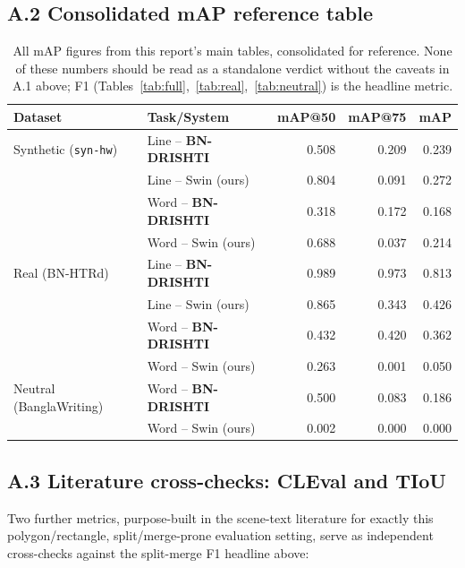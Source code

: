 \documentclass[11pt]{article}
\newcommand{\bnd}{\textbf{BN-DRISHTI}}
\begin{document}
\subsection*{A.2 Consolidated mAP reference table}

\begin{table}[H]
\centering
\caption{All mAP figures from this report's main tables, consolidated for reference.
None of these numbers should be read as a standalone verdict without the caveats in
A.1 above; F1 (Tables~\ref{tab:full},~\ref{tab:real},~\ref{tab:neutral}) is the
headline metric.}
\label{tab:appendix_map}
\footnotesize
\begin{tabular}{@{}llrrr@{}}
\toprule
Dataset & Task/System & mAP@50 & mAP@75 & mAP \\
\midrule
Synthetic (\texttt{syn-hw}) & Line -- \bnd{}   & 0.508 & 0.209 & 0.239 \\
 & Line -- Swin (ours)  & 0.804 & 0.091 & 0.272 \\
 & Word -- \bnd{}       & 0.318 & 0.172 & 0.168 \\
 & Word -- Swin (ours)  & 0.688 & 0.037 & 0.214 \\
\midrule
Real (BN-HTRd) & Line -- \bnd{}        & 0.989 & 0.973 & 0.813 \\
 & Line -- Swin (ours)          & 0.865 & 0.343 & 0.426 \\
 & Word -- \bnd{}       & 0.432 & 0.420 & 0.362 \\
 & Word -- Swin (ours)          & 0.263 & 0.001 & 0.050 \\
\midrule
Neutral (BanglaWriting) & Word -- \bnd{}       & 0.500 & 0.083 & 0.186 \\
 & Word -- Swin (ours) & 0.002 & 0.000 & 0.000 \\
\bottomrule
\end{tabular}
\end{table}

\subsection*{A.3 Literature cross-checks: CLEval and TIoU}

Two further metrics, purpose-built in the scene-text literature for exactly this
polygon/rectangle, split/merge-prone evaluation setting, serve as independent
cross-checks against the split-merge F1 headline above:
\end{document}
